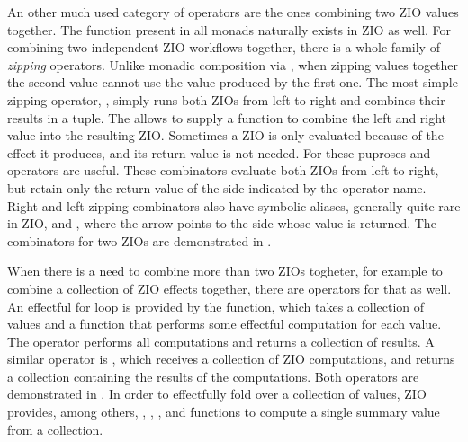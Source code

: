 

An other much used category of operators are the ones combining two ZIO values together. The  function present in all monads naturally exists in ZIO as well. For combining two independent ZIO workflows together, there is a whole family of \emph{zipping} operators. Unlike monadic composition via , when zipping values together the second value cannot use the value produced by the first one. The most simple zipping operator, , simply runs both ZIOs from left to right and combines their results in a tuple. The  allows to supply a function to combine the left and right value into the resulting ZIO. Sometimes a ZIO is only evaluated because of the effect it produces, and its return value is not needed. For these puproses  and  operators are useful. These combinators evaluate both ZIOs from left to right, but retain only the return value of the side indicated by the operator name. Right and left zipping combinators also have symbolic aliases, generally quite rare in ZIO, \inlinecode{*>} and \inlinecode{<*}, where the arrow points to the side whose value is returned. The combinators for two ZIOs are demonstrated in .



When there is a need to combine more than two ZIOs togheter, for example to combine a collection of ZIO effects together, there are operators for that as well. An effectful for loop is provided by the  function, which takes a collection of values and a function that performs some effectful computation for each value. The operator performs all computations and returns a collection of results. A similar operator is , which receives a collection of ZIO computations, and returns a collection containing the results of the computations. Both operators are demonstrated in . In order to effectfully fold over a collection of values, ZIO provides, among others, , , , and   functions to compute a single summary value from a collection.





